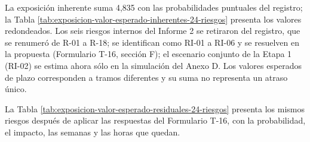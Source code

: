 \documentclass[anexo]{../../comun/overfore}
\begin{document}
La exposición inherente suma 4,835 con las probabilidades puntuales del registro; la Tabla \ref{tab:exposicion-valor-esperado-inherentes-24-riesgos} presenta los valores redondeados. Los seis riesgos internos del Informe 2 se retiraron del registro, que se renumeró de R-01 a R-18; se identifican como RI-01 a RI-06 y se resuelven en la propuesta (Formulario T-16, sección F); el escenario conjunto de la Etapa 1 (RI-02) se estima ahora sólo en la simulación del Anexo D. Los valores esperados de plazo corresponden a tramos diferentes y su suma no representa un atraso único.

La Tabla \ref{tab:exposicion-valor-esperado-residuales-24-riesgos} presenta los mismos riesgos después de aplicar las respuestas del Formulario T-16, con la probabilidad, el impacto, las semanas y las horas que quedan.
\end{document}
